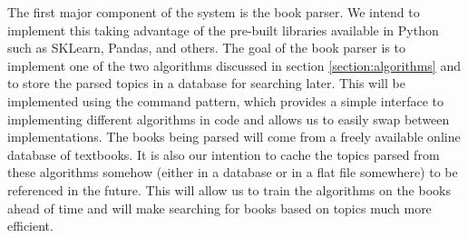 
The first major component of the system is the book parser.  
We intend to implement this taking advantage of the pre-built libraries available in Python such as SKLearn, Pandas, and others.  
The goal of the book parser is to implement one of the two algorithms discussed in section \ref{section:algorithms} and to store the parsed topics in a database for searching later.  
This will be implemented using the command pattern, which provides a simple interface to implementing different algorithms in code and allows us to easily swap between implementations.
The books being parsed will come from a freely available online database of textbooks.  
It is also our intention to cache the topics parsed from these algorithms somehow (either in a database or in a flat file somewhere) to be referenced in the future.  
This will allow us to train the algorithms on the books ahead of time and will make searching for books based on topics much more efficient. 